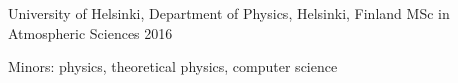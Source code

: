 

\begin{cventries}

  \cventry
    {University of Helsinki, Department of Physics, Helsinki, Finland} %
    {MSc in Atmospheric Sciences} %
    {} %
    {2016} %
    {
      \begin{cvitems} %
        \item {Minors: physics, theoretical physics, computer science}
      \end{cvitems}
    }

\end{cventries}
